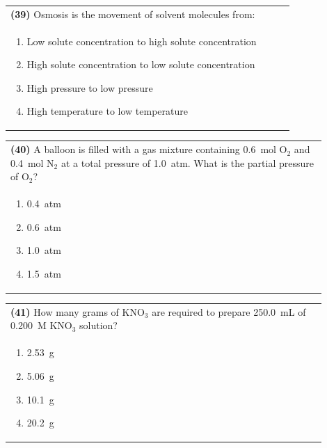 \documentclass{article}
\begin{document}
\noindent\begin{tabular}{|p{0.9\linewidth}|}
\hline
\textbf{(39)} Osmosis is the movement of solvent molecules from:\\[0.2cm]
\begin{minipage}[t]{0.85\linewidth}
\begin{enumerate}[label=\alph*.]
\item Low solute concentration to high solute concentration
\item High solute concentration to low solute concentration
\item High pressure to low pressure
\item High temperature to low temperature
\end{enumerate}
\end{minipage}\\[0.2cm]
\hline
\end{tabular}

\noindent\begin{tabular}{|p{0.9\linewidth}|}
\hline
\textbf{(40)} A balloon is filled with a gas mixture containing 0.6~mol O$_2$ and 0.4~mol N$_2$ at a total pressure of 1.0~atm. What is the partial pressure of O$_2$?\\[0.2cm]
\begin{minipage}[t]{0.85\linewidth}
\begin{enumerate}[label=\alph*.]
\item 0.4~atm
\item 0.6~atm
\item 1.0~atm
\item 1.5~atm
\end{enumerate}
\end{minipage}\\[0.2cm]
\hline
\end{tabular}

\noindent\begin{tabular}{|p{0.9\linewidth}|}
\hline
\textbf{(41)} How many grams of KNO$_3$ are required to prepare 250.0~mL of 0.200~M KNO$_3$ solution?\\[0.2cm]
\begin{minipage}[t]{0.85\linewidth}
\begin{enumerate}[label=\alph*.]
\item 2.53~g
\item 5.06~g
\item 10.1~g
\item 20.2~g
\end{enumerate}
\end{minipage}\\[0.2cm]
\hline
\end{tabular}
\end{document}
